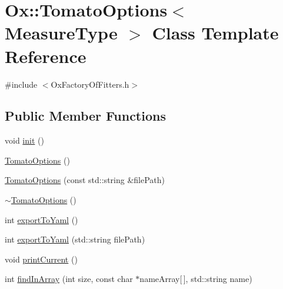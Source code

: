 \hypertarget{class_ox_1_1_tomato_options}{}\section{Ox\+:\+:Tomato\+Options$<$ Measure\+Type $>$ Class Template Reference}
\label{class_ox_1_1_tomato_options}


{\ttfamily \#include $<$Ox\+Factory\+Of\+Fitters.\+h$>$}

\subsection*{Public Member Functions}
\begin{DoxyCompactItemize}
\item 
void \hyperlink{class_ox_1_1_tomato_options_ab5ed8e439cf09ed9aca565c1facb5b1a}{init} ()
\item 
\hyperlink{class_ox_1_1_tomato_options_a71193c5376cb6a732895c160d312d85c}{Tomato\+Options} ()
\item 
\hyperlink{class_ox_1_1_tomato_options_a5c33d9488b728af994565639f75d9bba}{Tomato\+Options} (const std\+::string \&file\+Path)
\item 
\hyperlink{class_ox_1_1_tomato_options_a6f291fb0d37adaf6d4b2167e9c75af3e}{$\sim$\+Tomato\+Options} ()
\item 
int \hyperlink{class_ox_1_1_tomato_options_a41d923f3ffea2007a75217f4f651219b}{export\+To\+Yaml} ()
\item 
int \hyperlink{class_ox_1_1_tomato_options_aaa834ee2985662cdefbdbe4279481b33}{export\+To\+Yaml} (std\+::string file\+Path)
\item 
void \hyperlink{class_ox_1_1_tomato_options_a3a17d988d7ac73abef1ad2d79575ab30}{print\+Current} ()
\item 
int \hyperlink{class_ox_1_1_tomato_options_ac5b8f4b3fd18b6824188ddf0f39ab781}{find\+In\+Array} (int size, const char $\ast$name\+Array\mbox{[}$\,$\mbox{]}, std\+::string name)
\end{DoxyCompactItemize}
